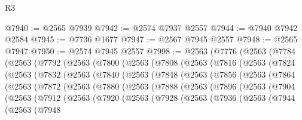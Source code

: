 \begin{lexlean}{R3}
\begin{coremodule}
@7940 := @2565 @7939
@7942 := @2574 @7937 @2557
@7944 := @7940 @7942 @2584
@7945 := @7736 @1677
@7947 := @2567 @7945 @2557
@7948 := @2565 @7947
@7950 := @2574 @7945 @2557
@7998 := @2563
    (@7776
      (@2563
        (@7784
          (@2563
            (@7792
              (@2563
                (@7800
                  (@2563
                    (@7808
                      (@2563
                        (@7816
                          (@2563
                            (@7824
                              (@2563
                                (@7832
                                  (@2563
                                    (@7840
                                      (@2563
                                        (@7848
                                          (@2563
                                            (@7856
                                              (@2563
                                                (@7864
                                                  (@2563
                                                    (@7872
                                                      (@2563
                                                        (@7880
                                                          (@2563
                                                            (@7888
                                                              (@2563
                                                                (@7896
                                                                  (@2563
                                                                    (@7904
                                                                      (@2563
                                                                        (@7912
                                                                          (@2563
                                                                            (@7920
                                                                              (@2563
                                                                                (@7928
                                                                                  (@2563
                                                                                    (@7936
                                                                                      (@2563
                                                                                        (@7944
                                                                                          (@2563
                                                                                            (@7948

\end{coremodule}
\end{lexlean}
